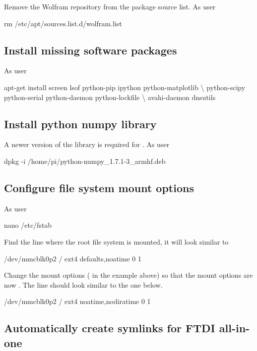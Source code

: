 Remove the Wolfram repository from the package source list. As user
\rootUser
\begin{Cmd}
rm /etc/apt/sources.list.d/wolfram.list 
\end{Cmd}

\subsection{Install missing software packages}
As user \rootUser
\begin{Cmd}
apt-get install screen lsof python-pip ipython python-matplotlib \textbackslash
    python-scipy python-serial python-daemon python-lockfile \textbackslash
    avahi-daemon dnsutils
\end{Cmd}

\subsection{Install python numpy library}

A newer version of the  library is required for
. As user \rootUser

\begin{Cmd}
dpkg -i /home/pi/python-numpy_1.7.1-3_armhf.deb
\end{Cmd}

\subsection{Configure file system mount options}

As user \rootUser
\begin{Cmd}
nano /etc/fstab  
\end{Cmd}

Find the line where the root file system is mounted, it will look
similar to
\begin{Cmd}
/dev/mmcblk0p2  /               ext4    defaults,noatime  0       1
\end{Cmd}
Change the mount options ( in the example
above) so that the mount options are now
. The line should look similar to the one
below.
\begin{Cmd}
/dev/mmcblk0p2  /               ext4    noatime,nodiratime  0       1
\end{Cmd}

\subsection{Automatically create symlinks for FTDI all-in-one}

